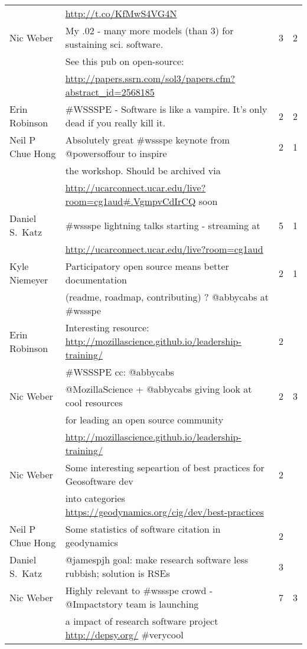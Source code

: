 \documentclass[11pt, oneside]{amsart}
\begin{document}
\begin{table*}[t]
\begin{scriptsize}
\begin{tabular}{@{}l l l l@{}}
\\ & \url{http://t.co/KfMwS4VG4N} & &
%
\\ Nic Weber & My .02 - many more models (than 3) for sustaining sci. software. & 3 & 2
\\ & See this pub on open-source:  & & 
\\ & \url{http://papers.ssrn.com/sol3/papers.cfm?abstract_id=2568185} & &
%
\\ Erin Robinson & \#WSSSPE - Software is like a vampire. It's only dead if you really kill it. & 2 & 2
%
\\ Neil P Chue Hong & Absolutely great \#wssspe keynote from @powersoffour to inspire & 2 & 1 
\\ & the workshop. Should be archived via & & 
\\ & \url{http://ucarconnect.ucar.edu/live?room=cg1aud#.VgmpvCdIrCQ} soon & & 
%
\\ Daniel S.\ Katz & \#wssspe lightning talks starting - streaming at  & 5  &  1
\\ &  \url{http://ucarconnect.ucar.edu/live?room=cg1aud} & & 
%
\\ Kyle Niemeyer & Participatory open source means better documentation  & 2 & 1 
\\ & (readme, roadmap, contributing) ? @abbycabs at \#wssspe & &
%
\\ Erin Robinson & Interesting resource: \url{http://mozillascience.github.io/leadership-training/} & 2 & 
\\ &  \#WSSSPE cc: @abbycabs & & 
%
\\ Nic Weber & @MozillaScience + @abbycabs giving look at cool resources & 2 & 3
\\ & for leading an open source community & & 
\\ & \url{http://mozillascience.github.io/leadership-training/} & & 
%
\\ Nic Weber & Some interesting sepeartion of best practices for Geosoftware dev & 2 & 
\\ & into categories \url{https://geodynamics.org/cig/dev/best-practices} & &
%
\\ Neil P Chue Hong & Some statistics of software citation in geodynamics & 2 & 
%
\\ Daniel S.\ Katz & @jamespjh goal: make research software less rubbish; solution is RSEs & 3 & 
%
\\ Nic Weber & Highly relevant to \#wssspe crowd - @Impactstory team is launching & 7 & 3
\\ & a impact of research software project \url{http://depsy.org/}  \#verycool & & 

\end{tabular}
\end{scriptsize}
\end{table*}
\end{document}
